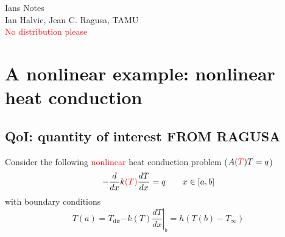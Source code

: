\documentclass[11pt]{article}
\newcommand{\be}{\begin{equation}}
\newcommand{\ee}{\end{equation}}
\newcommand{\tcr}[1]{\textcolor{red}{#1}}
\begin{document}

\begin{center}
{\huge Ians Notes}\\
{\Large Ian Halvic, Jean C. Ragusa, TAMU}\\
{\Large \textcolor{red}{No distribution please}}\\
\end{center}

\tableofcontents
\pagebreak



\section{A nonlinear example: nonlinear heat conduction}

\subsection{QoI: quantity of interest FROM RAGUSA}

Consider the following \tcr{nonlinear} heat conduction problem ($A(\tcr{T})T=q$)
\be
\label{eq:ex_heat_conduction}
-\frac{d}{dx}k\tcr{(T)}\frac{dT}{dx}=q \qquad x\in [a,b]
\ee
with boundary conditions
\begin{subequations}
\label{eq:ex_heat_conduction_bc}
\be
T(a) = T_{\text{dir}} 
\ee
\be
-k(T) \left.\frac{dT}{dx}\right|_b = h(T(b)-T_{\infty})
\ee
\end{subequations}
\end{document}
